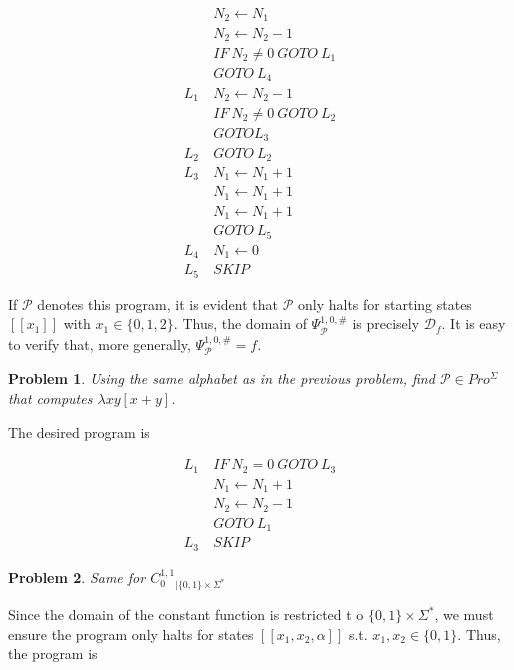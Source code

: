 \documentclass[a4paper, 12pt]{article}
\newtheorem{problem}{Problem}
\newtheorem{problem}{Problem}
\begin{document}
\begin{align*}
    &N_2 \leftarrow N_1\\
    &N_2 \leftarrow N_2 - 1\\
    &IF ~ N_2 \neq 0 ~ GOTO ~L_1 \\ 
    &GOTO ~ L_4 \\ 
    L_1 ~ &N_2 \leftarrow N_2 - 1 \\ 
    &IF ~  N_2 \neq 0 ~ GOTO ~ L_2\\
    &GOTO L_3\\
    L_2~& GOTO ~ L_2 \\ 
    L_3 ~ & N_1 \leftarrow N_1 + 1\\
    & N_1 \leftarrow N_1 + 1\\
    & N_1 \leftarrow N_1 + 1 \\ 
    & GOTO ~ L_5 \\
    L_4 ~ & N_1 \leftarrow 0 \\ 
    L_5~& SKIP
\end{align*}

If $\mathcal{P}$ denotes this program, it is evident that $\mathcal{P}$ only
halts for starting states $[\![ x_1 ]\!]$ with $x_1 \in \{0, 1, 2\}$.
Thus, the domain of $\Psi_{\mathcal{P}}^{1, 0, \#}$ is precisely
$\mathcal{D}_f$. It is easy to verify that, more generally,
$\Psi_{\mathcal{P}}^{1, 0, \#} = f$.

\begin{problem}
    Using the same alphabet as in the previous problem, find $\mathcal{P} \in
    Pro^{\Sigma}$ that computes $\lambda xy[x + y]$.
\end{problem}

The desired program is 

\begin{align*}
    L_1 ~ &IF ~ N_2 = 0 ~ GOTO ~ L_3 \\ 
          &N_1 \leftarrow N_1 + 1 \\ 
          &N_2 \leftarrow N_2 - 1 \\ 
          &GOTO ~ L_1\\
    L_3 ~ & SKIP
\end{align*}

\begin{problem}
    Same for $C_0^{1, 1}_{\mid \{0, 1\} \times  \Sigma^{*}}$
\end{problem}

Since the domain of the constant function is restricted t o $\{0, 1\} \times
\Sigma^{*}$, we must ensure the program only halts for states $[\![ x_1, x_2,
\alpha ]\!]$ s.t. $x_1,x_2 \in \{0, 1\}$. Thus, the program is 
\end{document}
